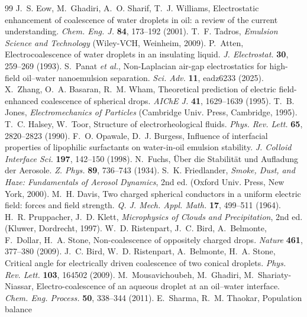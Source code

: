 \documentclass[aps,prfluids,reprint,amsmath,amssymb,superscriptaddress,longbibliography]{revtex4-2}
\begin{document}
\begin{thebibliography}{99}\small
{} J.~S. Eow, M.~Ghadiri, A.~O. Sharif, T.~J. Williams,
Electrostatic enhancement of coalescence of water droplets in oil: a review
of the current understanding. \emph{Chem. Eng. J.} \textbf{84}, 173--192
(2001).
 T.~F. Tadros, \emph{Emulsion Science and Technology}
(Wiley-VCH, Weinheim, 2009).
 P.~Atten, Electrocoalescence of water droplets in an
insulating liquid. \emph{J. Electrostat.} \textbf{30}, 259--269 (1993).
 S.~Panat \emph{et al.}, Non-Laplacian air-gap
electrostatics for high-field oil--water nanoemulsion separation.
\emph{Sci. Adv.} \textbf{11}, eadz6233 (2025).
 X.~Zhang, O.~A. Basaran, R.~M. Wham, Theoretical
prediction of electric field-enhanced coalescence of spherical drops.
\emph{AIChE J.} \textbf{41}, 1629--1639 (1995).
 T.~B. Jones, \emph{Electromechanics of Particles}
(Cambridge Univ. Press, Cambridge, 1995).
 T.~C. Halsey, W.~Toor, Structure of electrorheological
fluids. \emph{Phys. Rev. Lett.} \textbf{65}, 2820--2823 (1990).
 F.~O. Opawale, D.~J. Burgess, Influence of interfacial
properties of lipophilic surfactants on water-in-oil emulsion stability.
\emph{J. Colloid Interface Sci.} \textbf{197}, 142--150 (1998).
 N.~Fuchs, \"Uber die Stabilit\"at und Aufladung der
Aerosole. \emph{Z. Phys.} \textbf{89}, 736--743 (1934).
 S.~K. Friedlander, \emph{Smoke, Dust, and Haze:
Fundamentals of Aerosol Dynamics}, 2nd ed. (Oxford Univ. Press, New York,
2000).
 M.~H. Davis, Two charged spherical conductors in a
uniform electric field: forces and field strength. \emph{Q. J. Mech. Appl.
Math.} \textbf{17}, 499--511 (1964).
 H.~R. Pruppacher, J.~D. Klett, \emph{Microphysics
of Clouds and Precipitation}, 2nd ed. (Kluwer, Dordrecht, 1997).
 W.~D. Ristenpart, J.~C. Bird, A.~Belmonte,
F.~Dollar, H.~A. Stone, Non-coalescence of oppositely charged drops.
\emph{Nature} \textbf{461}, 377--380 (2009).
 J.~C. Bird, W.~D. Ristenpart, A.~Belmonte, H.~A. Stone,
Critical angle for electrically driven coalescence of two conical droplets.
\emph{Phys. Rev. Lett.} \textbf{103}, 164502 (2009).
 M.~Mousavichoubeh, M.~Ghadiri,
M.~Shariaty-Niassar, Electro-coalescence of an aqueous droplet at an
oil--water interface. \emph{Chem. Eng. Process.} \textbf{50}, 338--344
(2011).
 E.~Sharma, R.~M. Thaokar, Population balance

\end{thebibliography}
\end{document}

